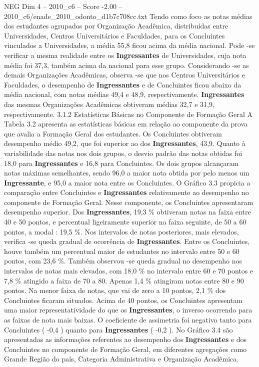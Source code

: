 \begin{textsample}{NEG Dim 4 – 2010\_c6 – Score -2.00 – 2010\_c6/enade\_2010\_odonto\_d1b7c708cc.txt}
Tendo como foco as notas médias dos estudantes agrupados por Organização Acadêmica, distribuídas entre Universidades, Centros Universitários e Faculdades, para os Concluintes vinculados a Universidades, a média 55,8 ficou acima da média nacional.
Pode -se verificar a mesma realidade entre os \textbf{Ingressantes} de Universidades, cuja nota média foi 37,3, também acima da nacional para esse grupo.
Considerando -se as demais Organizações Acadêmicas, observa -se que nos Centros Universitários e Faculdades, o desempenho de \textbf{Ingressantes} e de Concluintes ficou abaixo da média nacional, com notas médias 49,4 e 48,9, respectivamente. \textbf{Ingressantes} das mesmas Organizações Acadêmicas obtiveram médias 32,7 e 31,9, respectivamente. 3.1.2 Estatísticas Básicas no Componente de Formação Geral A Tabela 3.2 apresenta as estatísticas básicas em relação ao componente da prova que avalia a Formação Geral dos estudantes.
Os Concluintes obtiveram desempenho médio 49,2, que foi superior ao dos \textbf{Ingressantes}, 43,9.
Quanto à variabilidade das notas nos dois grupos, o desvio padrão das notas obtidas foi 18,0 para \textbf{Ingressantes} e 16,8 para Concluintes.
Os dois grupos alcançaram notas máximas semelhantes, sendo 96,0 a maior nota obtida por pelo menos um \textbf{Ingressante}, e 95,0 a maior nota entre os Concluintes.
O Gráfico 3.3 propicia a comparação entre Concluintes e \textbf{Ingressantes} relativamente ao desempenho no componente de Formação Geral.
Nesse componente, os Concluintes apresentaram desempenho superior.
Dos \textbf{Ingressantes}, 19,3 \% obtiveram notas na faixa entre 40 e 50 pontos, e percentual ligeiramente superior na faixa seguinte, de 50 a 60 pontos, a modal : 19,5 \%.
Nos intervalos de notas posteriores, mais elevados, verifica -se queda gradual de ocorrência de \textbf{Ingressantes}.
Entre os Concluintes, houve também um percentual maior de estudantes no intervalo entre 50 e 60 pontos, com 23,6 \%.
Também observou -se queda gradual no desempenho nos intervalos de notas mais elevados, com 18,0 \% no intervalo entre 60 e 70 pontos e 7,8 \% atingido a faixa de 70 a 80.
Apenas 1,4 \% atingiram notas entre 80 e 90 pontos.
Na menor faixa de notas, que vai de zero a 10 pontos, 2,1 \% dos Concluintes ficaram situados.
Acima de 40 pontos, os Concluintes apresentam uma maior representatividade do que os \textbf{Ingressantes}, o inverso ocorrendo para as faixas de nota mais baixas.
O coeficiente de assimetria foi negativo tanto para Concluintes ( -0,4 ) quanto para \textbf{Ingressantes} ( -0,2 ).
No Gráfico 3.4 são apresentadas as informações referentes ao desempenho dos \textbf{Ingressantes} e dos Concluintes no componente de Formação Geral, em diferentes agregações como Grande Região do país, Categoria Administrativa e Organização Acadêmica.

\end{textsample}

